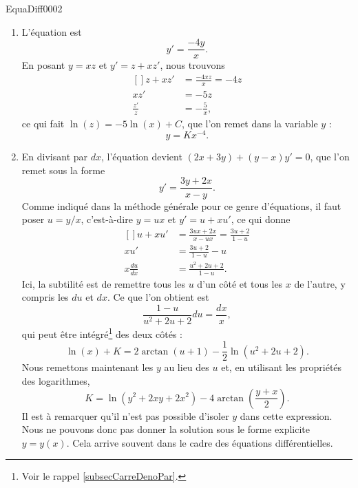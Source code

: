 \begin{corrige}{EquaDiff0002}

\begin{enumerate}

\item
L'équation est
\begin{equation}
	y'=\frac{ -4y }{ x }.
\end{equation}
En posant $y=xz$ et $y'=z+xz'$, nous trouvons
\begin{equation}
	\begin{aligned}[]
		z+xz'&=\frac{ -4xz }{ x }=-4z\\
		xz'&=-5z\\
		\frac{ z' }{ z }&=-\frac{ 5 }{ x },
	\end{aligned}
\end{equation}
ce qui fait $\ln(z)=-5\ln(x)+C$, que l'on remet dans la variable $y$ :
\begin{equation}
	y=Kx^{-4}.
\end{equation}


\item
En divisant par $dx$, l'équation devient $(2x+3y)+(y-x)y'=0$, que l'on remet sous la forme
\begin{equation}
	y'=\frac{ 3y+2x }{ x-y }.
\end{equation}
Comme indiqué dans la méthode générale pour ce genre d'équations, il faut poser $u=y/x$, c'est-à-dire $y=ux$ et $y'=u+xu'$, ce qui donne
\begin{equation}
	\begin{aligned}[]
		u+xu'&=\frac{ 3ux+2x }{ x-ux }=\frac{ 3u+2 }{ 1-u }\\
		xu'&=\frac{ 3u+2 }{ 1-u }-u\\
		x\frac{ du }{ dx }&=\frac{ u^2+2u+2 }{ 1-u }.
	\end{aligned}
\end{equation}
Ici, la subtilité est de remettre tous les $u$ d'un côté et tous les $x$ de l'autre, y compris les $du$ et $dx$. Ce que l'on obtient est
\begin{equation}
	\frac{ 1-u }{ u^2+2u+2 }du=\frac{ dx }{ x },
\end{equation}
qui peut être intégré\footnote{Voir le rappel \ref{subsecCarreDenoPar}.} des deux côtés :
\begin{equation}
	\ln(x)+K=2\arctan(u+1)-\frac{ 1 }{2}\ln(u^2+2u+2).
\end{equation}
Nous remettons maintenant les $y$ au lieu des $u$ et, en utilisant les propriétés des logarithmes, 
\begin{equation}
	K=\ln(y^2+2xy+2x^2)-4\arctan\left( \frac{ y+x }{ 2 } \right).
\end{equation}
Il est à remarquer qu'il n'est pas possible d'isoler $y$ dans cette expression. Nous ne pouvons donc pas donner la solution sous le forme explicite $y=y(x)$. Cela arrive souvent dans le cadre des équations différentielles.

\end{enumerate}

\end{corrige}

